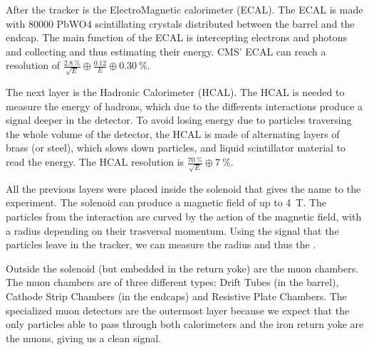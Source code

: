 After the tracker is the ElectroMagnetic calorimeter (ECAL).
The ECAL is made with 80000 PbWO4 scintillating crystals distributed between the barrel and the endcap.
The main function of the ECAL is intercepting electrons and photons and collecting and thus estimating their energy.
CMS' ECAL can reach a resolution of $\frac{\SI{2.8}{\percent}}{\sqrt{E}}\oplus\frac{0.12}{E}\oplus\SI{0.30}{\percent}$.

The next layer is the Hadronic Calorimeter (HCAL).
The HCAL is needed to measure the energy of hadrons, which due to the differents interactions produce a signal deeper in the detector.
To avoid losing energy due to particles traversing the whole volume of the detector, the HCAL is made of alternating layers of brass (or steel), which slows down particles, and liquid scintillator material to read the energy.
The HCAL resolution is $\frac{\SI{70}{\percent}}{\sqrt{E}}\oplus\SI{7}{\percent}$.

All the previous layers were placed inside the solenoid that gives the name to the experiment.
The solenoid can produce a magnetic field of up to \SI{4}{\tesla}.
The particles from the interaction are curved by the action of the magnetic field, with a radius depending on their trasversal momentum.
Using the signal that the particles leave in the tracker, we can measure the radius and thus the \pt.

Outside the solenoid (but embedded in the return yoke) are the muon chambers.
The muon chambers are of three different types: Drift Tubes (in the barrel), Cathode Strip Chambers (in the endcaps) and Resistive Plate Chambers.
The specialized muon detectors are the outermost layer because we expect that the only particles able to pass through both calorimeters and the iron return yoke are the muons, giving us a clean signal.

